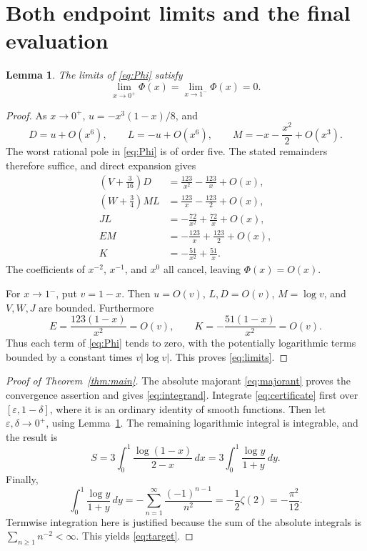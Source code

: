 \documentclass[11pt,a4paper]{article}
\newtheorem{lemma}[theorem]{Lemma}
\numberwithin{equation}{section}
\begin{document}
\section{Both endpoint limits and the final evaluation}
\begin{lemma}\label{lem:endpoints}
The limits of \eqref{eq:Phi} satisfy
\begin{equation}\label{eq:limits}
 \lim_{x\to0^+}\Phi(x)=\lim_{x\to1^-}\Phi(x)=0.
\end{equation}
\end{lemma}
\begin{proof}
As $x\to0^+$, $u=-x^3(1-x)/8$, and
\[
 D=u+O(x^6),\qquad L=-u+O(x^6),\qquad
 M=-x-\frac{x^2}{2}+O(x^3).
\]
The worst rational pole in \eqref{eq:Phi} is of order five. The stated remainders therefore suffice, and direct expansion gives
\begin{align*}
 (V+\tfrac3{16})D&=\frac{123}{x^2}-\frac{123}{x}+O(x),\\
 (W+\tfrac34)ML&=\frac{123}{x}-\frac{123}{2}+O(x),\\
 JL&=-\frac{72}{x^2}+\frac{72}{x}+O(x),\\
 EM&=-\frac{123}{x}+\frac{123}{2}+O(x),\\
 K&=-\frac{51}{x^2}+\frac{51}{x}.
\end{align*}
The coefficients of $x^{-2}$, $x^{-1}$, and $x^0$ all cancel, leaving $\Phi(x)=O(x)$.

For $x\to1^-$, put $v=1-x$. Then $u=O(v)$, $L,D=O(v)$, $M=\log v$, and $V,W,J$ are bounded. Furthermore
\[
 E=\frac{123(1-x)}{x^2}=O(v),\qquad
 K=-\frac{51(1-x)}{x^2}=O(v).
\]
Thus each term of \eqref{eq:Phi} tends to zero, with the potentially logarithmic terms bounded by a constant times $v|\log v|$. This proves \eqref{eq:limits}.
\end{proof}

\begin{proof}[Proof of Theorem~\ref{thm:main}]
The absolute majorant \eqref{eq:majorant} proves the convergence assertion and gives \eqref{eq:integrand}. Integrate \eqref{eq:certificate} first over $[\varepsilon,1-\delta]$, where it is an ordinary identity of smooth functions. Then let $\varepsilon,\delta\to0^+$, using Lemma~\ref{lem:endpoints}. The remaining logarithmic integral is integrable, and the result is
\[
 S=3\int_0^1\frac{\log(1-x)}{2-x}\,dx
  =3\int_0^1\frac{\log y}{1+y}\,dy.
\]
Finally,
\[
 \int_0^1\frac{\log y}{1+y}\,dy
 =-\sum_{n=1}^{\infty}\frac{(-1)^{n-1}}{n^2}
 =-\frac12\zeta(2)=-\frac{\pi^2}{12}.
\]
Termwise integration here is justified because the sum of the absolute integrals is $\sum_{n\ge1}n^{-2}<\infty$. This yields \eqref{eq:target}.
\end{proof}
\end{document}
